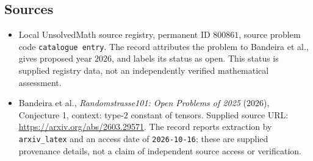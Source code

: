 \documentclass[11pt]{article}
\begin{document}
\subsection{Sources}
\begin{itemize}
\item Local UnsolvedMath source registry, permanent ID $800861$, source problem code \texttt{catalogue entry}. The record attributes the problem to Bandeira et al., gives proposed year $2026$, and labels its status as open. This status is supplied registry data, not an independently verified mathematical assessment.
\item Bandeira et al., \emph{Randomstrasse101: Open Problems of 2025} ($2026$), Conjecture 1, context: type-$2$ constant of tensors. Supplied source URL: \url{https://arxiv.org/abs/2603.29571}. The record reports extraction by \texttt{arxiv\_latex} and an access date of \texttt{2026-10-16}; these are supplied provenance details, not a claim of independent source access or verification.
\end{itemize}
\end{document}
